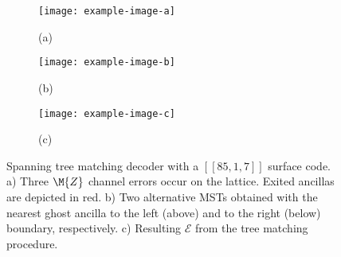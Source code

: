 \documentclass{article}
\begin{document}
\begin{figure}[h]
    \centering
    \begin{subfigure}{0.32\textwidth}
        \centering
        \caption{(a)}
        \label{fig:sub1}
        \texttt{[image: example-image-a]}
    \end{subfigure}
    \begin{subfigure}{0.32\textwidth}
        \centering
        \caption{(b)}
        \label{fig:sub2}
        \texttt{[image: example-image-b]}
    \end{subfigure}
    \begin{subfigure}{0.32\textwidth}
        \centering
        \caption{(c)}
        \label{fig:sub3}
        \texttt{[image: example-image-c]}
    \end{subfigure}
    
    \caption{Spanning tree matching decoder with a $[[85,1,7]]$ surface code. 
    a) Three $\M{Z}$ channel errors occur on the lattice. Exited ancillas are depicted in red.
    b) Two alternative \acp{MST} obtained with the nearest ghost ancilla to the left (above) and to the right (below) boundary, respectively.
    c) Resulting $\mathcal{E}$ from the tree matching procedure.}
    \label{fig:my_label}
\end{figure}
\end{document}
